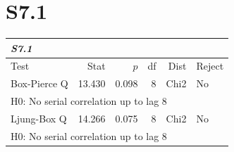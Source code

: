 \section*{S7.1}
\renewcommand{\arraystretch}{1.1}
\setlength{\tabcolsep}{6pt}
\begin{table}[H]
\centering
\begin{tabular}{lrrrrl}
\hline
\multicolumn{6}{l}{\textit{S7.1}} \\
\hline
Test & Stat & $p$ & df & Dist & Reject \\
\hline
Box-Pierce Q & 13.430 & 0.098 & 8 & Chi2 & No \\
\multicolumn{6}{l}{\footnotesize{H0: No serial correlation up to lag 8}} \\
Ljung-Box Q & 14.266 & 0.075 & 8 & Chi2 & No \\
\multicolumn{6}{l}{\footnotesize{H0: No serial correlation up to lag 8}} \\
\hline
\end{tabular}
\end{table}
